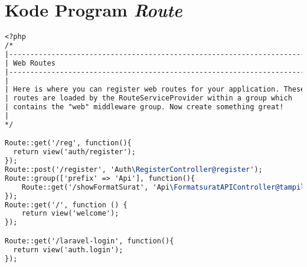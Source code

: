 \chapter{Kode Program \textit{Route}}
\label{lamp:E}

\begin{lstlisting}[language=tex,basicstyle=
\tiny,caption=route.php]
<?php
/*
|--------------------------------------------------------------------------
| Web Routes
|--------------------------------------------------------------------------
|
| Here is where you can register web routes for your application. These
| routes are loaded by the RouteServiceProvider within a group which
| contains the "web" middleware group. Now create something great!
|
*/

Route::get('/reg', function(){
  return view('auth/register');
});
Route::post('/register', 'Auth\RegisterController@register');
Route::group(['prefix' => 'Api'], function(){
    Route::get('/showFormatSurat', 'Api\FormatsuratAPIController@tampilkanFormat');
});
Route::get('/', function () {
    return view('welcome');
});

Route::get('/laravel-login', function(){
  return view('auth.login');
});


\end{lstlisting}
